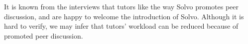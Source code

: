 \documentclass[a4paper]{article}
\begin{document}
    \noindent It is known from the interviews that tutors like the way Solvo promotes peer discussion, and are happy to welcome the introduction of Solvo.
    Although it is hard to verify, we may infer that tutors' workload can be reduced because of promoted peer discussion.

\end{document}
